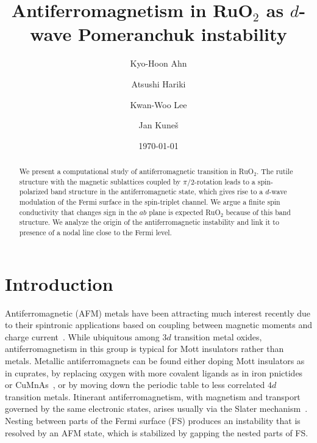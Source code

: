 \documentclass[reprint,twocolumn,superscriptaddress,secnumarabic,amssymb, nobibnotes, aps, prb]{revtex4-1}
\begin{document}
\title{Antiferromagnetism in RuO$_2$ as $d$-wave Pomeranchuk instability }

\author{Kyo-Hoon Ahn}
\author{Atsushi Hariki}
\author{Kwan-Woo Lee}
\author{Jan Kune\v{s}}
\date{\today}

\begin{abstract}
We present a computational study of antiferromagnetic transition in 
RuO$_2$. The rutile structure with the magnetic sublattices coupled by $\pi/2$-rotation leads to a spin-polarized band structure in the antiferromagnetic state, which gives rise to a $d$-wave modulation of the Fermi surface in the spin-triplet channel. We argue a finite spin conductivity  that changes sign in the $ab$ plane is expected RuO$_2$ because of this band structure. We analyze the
origin of the antiferromagnetic instability and link it to presence of a nodal line close to the Fermi level.
\end{abstract}

\maketitle
\section{Introduction}
Antiferromagnetic (AFM) metals have been attracting much interest recently due to their spintronic applications based on coupling between magnetic moments and charge current~\cite{wadley2016}. 
While ubiquitous among $3d$ transition metal oxides, antiferromagnetism in this group is typical for Mott insulators rather than metals. Metallic antiferromagnets can be found either doping Mott insulators as in cuprates, by replacing oxygen with more covalent ligands as in iron pnictides~\cite{Kamihara2008} or {CuMnAs}~\cite{Wadley2013}, or by moving down the periodic table to less correlated $4d$ transition metals. %
Itinerant antiferromagnetism, with magnetism and transport governed by the same
electronic states, arises usually via the Slater mechanism~\cite{Slater1951}. Nesting between parts of the Fermi surface (FS) produces an instability that is resolved by an AFM state, which is stabilized by gapping the nested parts of FS. 
\end{document}

